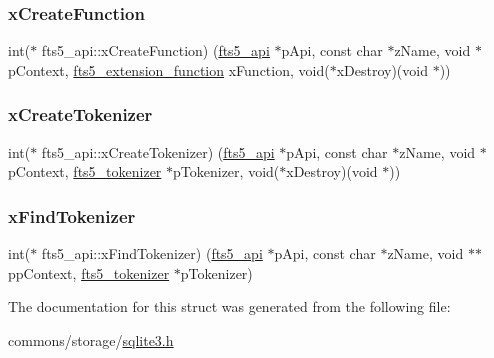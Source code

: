 \mbox{\label{structfts5__api_acf1a0612be3b91b908f38ecbc6735d17}} 
\subsubsection{\texorpdfstring{xCreateFunction}{xCreateFunction}}
{\footnotesize\ttfamily int($\ast$ fts5\+\_\+api\+::x\+Create\+Function) (\mbox{\hyperlink{structfts5__api}{fts5\+\_\+api}} $\ast$p\+Api, const char $\ast$z\+Name, void $\ast$p\+Context, \mbox{\hyperlink{sqlite3_8h_a8a1df7b5a066b194f490be5936e85c17}{fts5\+\_\+extension\+\_\+function}} x\+Function, void($\ast$x\+Destroy)(void $\ast$))}

\mbox{\label{structfts5__api_a7fe3663f85eab512d5c461e1674da129}} 
\subsubsection{\texorpdfstring{xCreateTokenizer}{xCreateTokenizer}}
{\footnotesize\ttfamily int($\ast$ fts5\+\_\+api\+::x\+Create\+Tokenizer) (\mbox{\hyperlink{structfts5__api}{fts5\+\_\+api}} $\ast$p\+Api, const char $\ast$z\+Name, void $\ast$p\+Context, \mbox{\hyperlink{structfts5__tokenizer}{fts5\+\_\+tokenizer}} $\ast$p\+Tokenizer, void($\ast$x\+Destroy)(void $\ast$))}

\mbox{\label{structfts5__api_a20a23794695fa61e2892ad1243b16b67}} 
\subsubsection{\texorpdfstring{xFindTokenizer}{xFindTokenizer}}
{\footnotesize\ttfamily int($\ast$ fts5\+\_\+api\+::x\+Find\+Tokenizer) (\mbox{\hyperlink{structfts5__api}{fts5\+\_\+api}} $\ast$p\+Api, const char $\ast$z\+Name, void $\ast$$\ast$pp\+Context, \mbox{\hyperlink{structfts5__tokenizer}{fts5\+\_\+tokenizer}} $\ast$p\+Tokenizer)}



The documentation for this struct was generated from the following file\+:\begin{DoxyCompactItemize}
\item 
commons/storage/\mbox{\hyperlink{sqlite3_8h}{sqlite3.\+h}}\end{DoxyCompactItemize}
